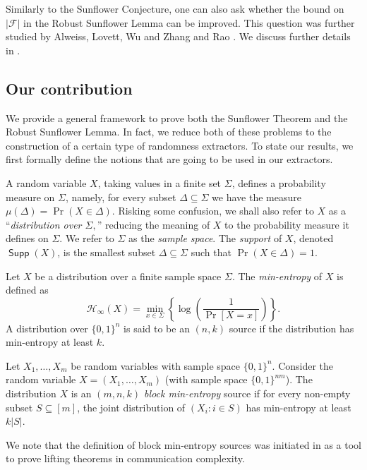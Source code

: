 \documentclass{toc}
\def\entropy{\mathcal{H}}
\newcommand{\calF}{\mathcal{F}} %
\DeclareMathOperator{\Supp}{\mathsf{Supp}}  %
\begin{document}
%
Similarly   %
to the Sunflower Conjecture, one can also ask whether the bound on $|\calF|$ in the Robust Sunflower Lemma can be improved. This question was further studied by Alweiss, Lovett, Wu and Zhang \cite{alweiss2020improved} and Rao \cite{rao2020coding}. We discuss further details in .

\subsection{Our contribution} We provide a general framework to prove both the Sunflower Theorem and the Robust Sunflower Lemma. In fact, we reduce
both of these problems to the construction of a certain type of randomness extractors. To state our results, we first formally define the notions
that are going to be used in our extractors.

%
%
%

%
A random variable $X$, taking values in a finite set $\Sigma$,
defines a probability measure on $\Sigma$, namely,
for every subset $\Delta\subseteq\Sigma$ we have the measure
$\mu(\Delta)=\Pr(X\in\Delta)$.  Risking some confusion,
we shall also refer to $X$ as a ``\emph{distribution over $\Sigma,$}''
reducing the meaning of $X$ to the probability measure it defines
on $\Sigma$.  We refer to $\Sigma$ as the \emph{sample space}.
%
The \emph{support} of $X$, denoted $\Supp(X)$, is the smallest
subset $\Delta\subseteq\Sigma$ such that $\Pr(X\in\Delta)=1$.
%
%

\begin{definition} Let $X$ be a distribution over a
finite sample space $\Sigma$.  
The \emph{min-entropy} of $X$ is defined as
%
%
\[ \entropy_{\infty}(X) =
\min_{x\in\Sigma}\left\{\log\left(\frac{1}{\Pr[X=x]}\right)\right\}. \]
%
%
A distribution over 
$ \{0,1\}^{n}$ is said to be an $(n, k)$ source if
the distribution has min-entropy at least $k$.
\end{definition}


\begin{definition}
%
Let $X_1,\dots,X_m$ be random variables with sample space $\{0, 1\}^n$.
Consider the random variable $X=(X_1,\dots,X_m)$ (with sample space
$\{0, 1\}^{nm}$).  %
%
%
The distribution $X$   %
is an \emph{$(m, n, k)$ block min-entropy} source if for every
non-empty subset $S \subseteq [m]$, the joint distribution of
$(X_i: i \in S)$ has min-entropy at least $k|S|$.
\end{definition}

We note that the definition of block min-entropy sources was initiated
in \cite{GLMWZ16} as a tool to prove lifting theorems in communication
complexity.
\end{document}
